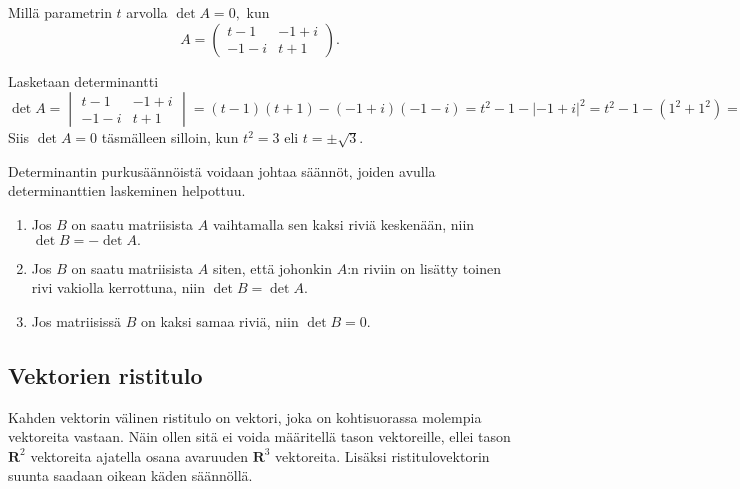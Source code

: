 \documentclass[a4paper, 12pt]{article}
\theoremstyle{remark}
\theoremstyle{definition}
\newcommand{\vek}[1]{\mbox{\boldmath$#1$}}
\renewcommand{\vec}[1]{\vek{#1}}
\newcommand{\abs}[1]{\lvert#1\rvert}
\begin{document}
\begin{esim}
Millä parametrin $t$ arvolla $\det A=0,$ kun
$$
A=\begin{pmatrix}
t-1&-1+i\\
-1-i&t+1
\end{pmatrix}.
$$
\end{esim}
\begin{rat}
Lasketaan determinantti
$$
\det A= \begin{vmatrix}
t-1&-1+i\\
-1-i&t+1
\end{vmatrix}=
(t-1)(t+1)-(-1+i)(-1-i)=t^2-1-\abs{-1+i}^2=t^2-1-(1^2+1^2)=t^2-3.
$$
Siis $\det A=0$ täsmälleen silloin, kun $t^2=3$ eli $t=\pm\sqrt{3}.$
\end{rat}

Determinantin purkusäännöistä voidaan johtaa säännöt, joiden avulla determinanttien laskeminen helpottuu.
\begin{lause}
\begin{enumerate}[leftmargin=*, label=\alph*), topsep=3pt, itemsep=9pt, parsep=0pt, font=\bfseries\color{red}]
\item Jos $B$ on saatu matriisista $A$ vaihtamalla sen kaksi riviä keskenään, niin $\det B=-\det A.$
\item Jos $B$ on saatu matriisista $A$ siten, että johonkin $A$:n riviin on lisätty toinen rivi vakiolla kerrottuna, niin $\det B=\det A.$
\item Jos matriisissä $B$ on kaksi samaa riviä, niin $\det B=0.$
\end{enumerate}
\end{lause}

\clearpage
\subsection{Vektorien ristitulo}
Kahden vektorin välinen ristitulo on vektori, joka on kohtisuorassa molempia vektoreita vastaan. Näin ollen sitä ei voida määritellä tason vektoreille, ellei tason $\mathbf{R}^2$ vektoreita ajatella osana avaruuden $\mathbf{R}^3$ vektoreita. Lisäksi ristitulovektorin suunta saadaan oikean käden säännöllä.

\end{document}
